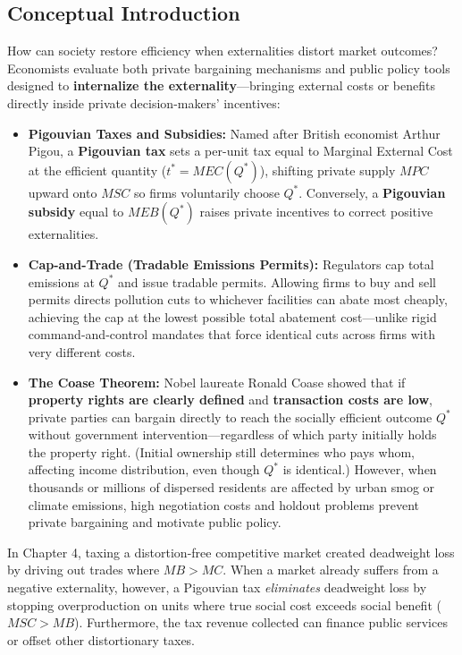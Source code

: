 \documentclass[11pt,letterpaper]{article}
\begin{document}
\subsection*{Conceptual Introduction}
How can society restore efficiency when externalities distort market outcomes? Economists evaluate both private bargaining mechanisms and public policy tools designed to \textbf{internalize the externality}—bringing external costs or benefits directly inside private decision-makers' incentives:
\begin{itemize}
    \item \textbf{Pigouvian Taxes and Subsidies:} Named after British economist Arthur Pigou, a \textbf{Pigouvian tax} sets a per-unit tax equal to Marginal External Cost at the efficient quantity ($t^* = MEC(Q^*)$), shifting private supply $MPC$ upward onto $MSC$ so firms voluntarily choose $Q^*$. Conversely, a \textbf{Pigouvian subsidy} equal to $MEB(Q^*)$ raises private incentives to correct positive externalities.
    \item \textbf{Cap-and-Trade (Tradable Emissions Permits):} Regulators cap total emissions at $Q^*$ and issue tradable permits. Allowing firms to buy and sell permits directs pollution cuts to whichever facilities can abate most cheaply, achieving the cap at the lowest possible total abatement cost—unlike rigid command-and-control mandates that force identical cuts across firms with very different costs.
    \item \textbf{The Coase Theorem:} Nobel laureate Ronald Coase showed that if \textbf{property rights are clearly defined} and \textbf{transaction costs are low}, private parties can bargain directly to reach the socially efficient outcome $Q^*$ without government intervention—regardless of which party initially holds the property right. (Initial ownership still determines who pays whom, affecting income distribution, even though $Q^*$ is identical.) However, when thousands or millions of dispersed residents are affected by urban smog or climate emissions, high negotiation costs and holdout problems prevent private bargaining and motivate public policy.
\end{itemize}

\begin{tcolorbox}[colback=CourseAmber!10!white,colframe=CourseOrange!85!black,title=\textbf{Clear It Up: Why a Pigouvian Tax Increases Welfare Instead of Causing DWL}]
In Chapter 4, taxing a distortion-free competitive market created deadweight loss by driving out trades where $MB > MC$. When a market already suffers from a negative externality, however, a Pigouvian tax \emph{eliminates} deadweight loss by stopping overproduction on units where true social cost exceeds social benefit ($MSC > MB$). Furthermore, the tax revenue collected can finance public services or offset other distortionary taxes.
\end{tcolorbox}
\end{document}
